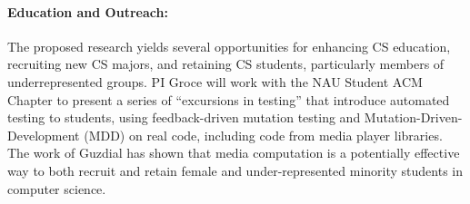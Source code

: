 \paragraph{Education and Outreach:}
The proposed research yields several opportunities for enhancing CS
education, recruiting new CS majors, and retaining CS students,
particularly members of underrepresented groups.  
PI Groce will work with the NAU Student ACM Chapter to present a
series of ``excursions in testing'' that introduce automated testing
to students, using feedback-driven mutation testing and Mutation-Driven-Development (MDD) on real code, including code from
media player libraries.  The work of Guzdial
\cite{Guzdial} has shown that media computation is a
potentially effective way to both recruit and retain female and
under-represented minority students in computer science.
